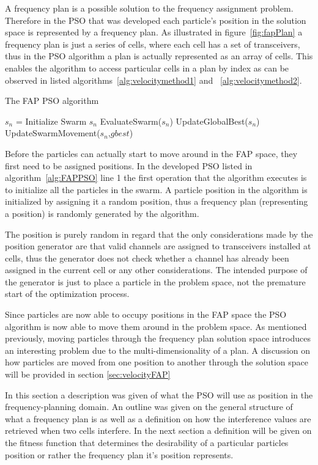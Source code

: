 A frequency plan is a possible solution to the frequency assignment problem. Therefore in the PSO that was developed each particle's position in the solution space is represented by a frequency plan. As illustrated in figure~\ref{fig:fapPlan} a frequency plan is just a series of cells, where each cell has a set of transceivers, thus in the PSO algorithm a plan is actually represented as an array of cells. This enables the algorithm to access particular cells in a plan by index as can be observed in listed algorithms~\ref{alg:velocitymethod1} and ~\ref{alg:velocitymethod2}. 

\begin{algorithm}
\label{alg:FAPPSO}
\caption{The FAP PSO algorithm}
\begin{algorithmic}
\STATE $s_n$ = Initialize Swarm $s_n$
	\STATE EvaluateSwarm($s_n$)
	\STATE UpdateGlobalBest($s_n$)
	\STATE UpdateSwarmMovement($s_n$,$gbest$)
\ENDWHILE
\end{algorithmic}
\end{algorithm}

Before the particles can actually start to move around in the FAP space, they first need to be assigned positions. In the developed PSO listed in algorithm~\ref{alg:FAPPSO} line 1 the first operation that the algorithm executes is to initialize all the particles in the swarm. A particle position in the algorithm is initialized by assigning it a random position, thus a frequency plan (representing a position) is randomly generated by the algorithm.

The position is purely random in regard that the only considerations made by the position generator are that valid channels are assigned to transceivers installed at cells, thus the generator does not check whether a channel has already been assigned in the current cell or any other considerations. The intended purpose of the generator is just to place a particle in the problem space, not the premature start of the optimization process.

Since particles are now able to occupy positions in the FAP space the PSO algorithm is now able to move them around in the problem space. As mentioned previously, moving particles through the frequency plan solution space introduces an interesting problem due to the multi-dimensionality of a plan. A discussion on how particles are moved from one position to another through the solution space will be provided in section \ref{sec:velocityFAP}

In this section a description was given of what the PSO will use as position in the frequency-planning domain. An outline was given on the general structure of what a frequency plan is as well as a definition on how the interference values are retrieved when two cells interfere. In the next section a definition will be given on the fitness function that determines the desirability of a particular particles position or rather the frequency plan it's position represents.
